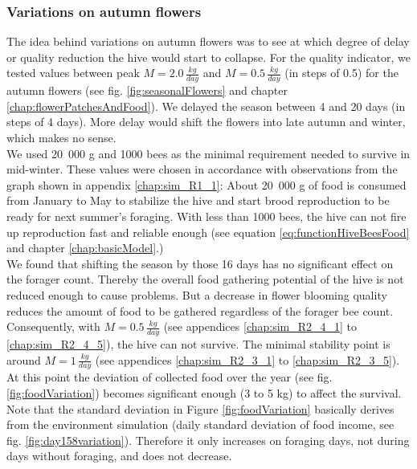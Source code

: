 	\subsubsection{Variations on autumn flowers}
		\label{chap:variationsOnAutumnFlowers}
		The idea behind variations on autumn flowers was to see at which degree of delay or quality reduction the hive would start to collapse. For the quality indicator, we tested values between peak $M = 2.0\,\frac{kg}{day}$ and $M = 0.5\,\frac{kg}{day}$ (in steps of 0.5) for the autumn flowers (see fig. \ref{fig:seasonalFlowers} and chapter \ref{chap:flowerPatchesAndFood}). We delayed the season between 4 and 20 days (in steps of 4 days). More delay would shift the flowers into late autumn and winter, which makes no sense.\\
		We used 20~000 g and 1000 bees as the minimal requirement needed to survive in mid-winter. These values were chosen in accordance with observations from the graph shown in appendix \ref{chap:sim_R1_1}: About 20~000 g of food is consumed from January to May to stabilize the hive and start brood reproduction to be ready for next summer's foraging. With less than 1000 bees, the hive can not fire up reproduction fast and reliable enough (see equation \ref{eq:functionHiveBeesFood} and chapter \ref{chap:basicModel}.)\\
		We found that shifting the season by those 16 days has no significant effect on the forager count. Thereby the overall food gathering potential of the hive is not reduced enough to cause problems. But a decrease in flower blooming quality reduces the amount of food to be gathered regardless of the forager bee count. Consequently, with $M = 0.5\,\frac{kg}{day}$ (see appendices \ref{chap:sim_R2_4_1} to \ref{chap:sim_R2_4_5}), the hive can not survive. The minimal stability point is around $M = 1\,\frac{kg}{day}$ (see appendices \ref{chap:sim_R2_3_1} to \ref{chap:sim_R2_3_5}). At this point the deviation of collected food over the year (see fig. \ref{fig:foodVariation}) becomes significant enough (3 to 5 kg) to affect the survival.\\
		
		Note that the standard deviation in Figure \ref{fig:foodVariation} basically derives  from the environment simulation (daily standard deviation of food income, see fig. \ref{fig:day158variation}). Therefore it only increases on foraging days, not during days without foraging, and does not decrease.
		
